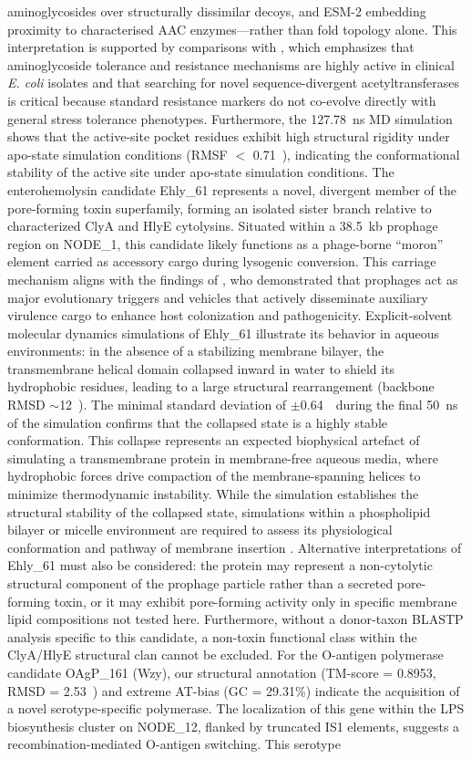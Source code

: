 \documentclass[pdflatex,sn-mathphys-num]{sn-jnl}
\begin{document}
aminoglycosides over structurally dissimilar decoys, and ESM-2 embedding proximity to characterised AAC enzymes—rather than fold topology alone. This interpretation is supported by comparisons with \cite{ribeiro2021nitric}, which emphasizes that aminoglycoside tolerance and resistance mechanisms are highly active in clinical \textit{E. coli} isolates and that searching for novel sequence-divergent acetyltransferases is critical because standard resistance markers do not co-evolve directly with general stress tolerance phenotypes. Furthermore, the 127.78~ns MD simulation shows that the active-site pocket residues exhibit high structural rigidity under apo-state simulation conditions (RMSF $<$ 0.71~\text{\AA}), indicating the conformational stability of the active site under apo-state simulation conditions. The enterohemolysin candidate Ehly\_61 represents a novel, divergent member of the pore-forming toxin superfamily, forming an isolated sister branch relative to characterized ClyA and HlyE cytolysins. Situated within a 38.5~kb prophage region on NODE\_1, this candidate likely functions as a phage-borne ``moron'' element carried as accessory cargo during lysogenic conversion. This carriage mechanism aligns with the findings of \cite{erdogdu2026prophage}, who demonstrated that prophages act as major evolutionary triggers and vehicles that actively disseminate auxiliary virulence cargo to enhance host colonization and pathogenicity. Explicit-solvent molecular dynamics simulations of Ehly\_61 illustrate its behavior in aqueous environments: in the absence of a stabilizing membrane bilayer, the transmembrane helical domain collapsed inward in water to shield its hydrophobic residues, leading to a large structural rearrangement (backbone RMSD $\sim$12~\text{\AA}). The minimal standard deviation of $\pm$0.64~\text{\AA}\ during the final 50~ns of the simulation confirms that the collapsed state is a highly stable conformation. This collapse represents an expected biophysical artefact of simulating a transmembrane protein in membrane-free aqueous media, where hydrophobic forces drive compaction of the membrane-spanning helices to minimize thermodynamic instability. While the simulation establishes the structural stability of the collapsed state, simulations within a phospholipid bilayer or micelle environment are required to assess its physiological conformation and pathway of membrane insertion \cite{mueller2009crystal}. Alternative interpretations of Ehly\_61 must also be considered: the protein may represent a non-cytolytic structural component of the prophage particle rather than a secreted pore-forming toxin, or it may exhibit pore-forming activity only in specific membrane lipid compositions not tested here. Furthermore, without a donor-taxon BLASTP analysis specific to this candidate, a non-toxin functional class within the ClyA/HlyE structural clan cannot be excluded. For the O-antigen polymerase candidate OAgP\_161 (Wzy), our structural annotation (TM-score = 0.8953, RMSD = 2.53~\text{\AA}) and extreme AT-bias (GC = 29.31\%) indicate the acquisition of a novel serotype-specific polymerase. The localization of this gene within the LPS biosynthesis cluster on NODE\_12, flanked by truncated IS1 elements, suggests a recombination-mediated O-antigen switching. This serotype 
\end{document}

